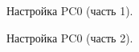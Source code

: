 \documentclass[a4paper,14pt]{article}
\begin{document}
\begin{figure}[!h]
    \caption{Настройка PC0 (часть 1).}
    \label{fig:pc1_set}
\end{figure}

\newpage
\begin{figure}[!h]
    \caption{Настройка PC0 (часть 2).}
    \label{fig:pc1_set2}
\end{figure}
\end{document}
